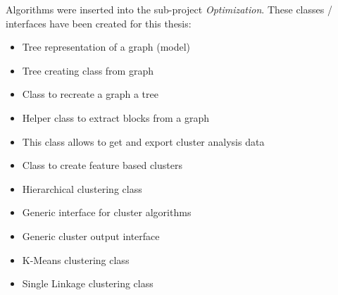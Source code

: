 Algorithms were inserted into the sub-project \textit{Optimization}. These classes / interfaces have been created for this thesis:
\begin{itemize}
    \item Tree representation of a graph (model) \newline
    \item Tree creating class from graph \newline
    \item Class to recreate a graph a tree \newline
    \item Helper class to extract blocks from a graph \newline
    \item This class allows to get and export cluster analysis data \newline 
    \item  Class to create feature based clusters \newline 
    \item Hierarchical clustering class \newline 
    \item Generic interface for cluster algorithms\newline
    \item Generic cluster output interface \newline 
    \item K-Means clustering class \newline
    \item Single Linkage clustering class \newline
\end{itemize}

\pagebreak
